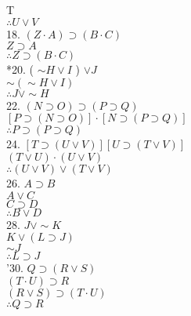 T\\
$\therefore U \vee V$\\
18. $(Z \cdot A) \supset(B \cdot C)$\\
$Z \supset A$\\
$\therefore Z \supset(B \cdot C)$\\
*20. ( $\sim H \vee I$ ) $\vee J$\\
$\sim(\sim H \vee I)$\\
$\therefore J \vee \sim H$\\
22. $(N \supset O) \supset(P \supset Q)$\\
$[P \supset(N \supset O)] \cdot[N \supset(P \supset Q)]$\\
$\therefore P \supset(P \supset Q)$\\
24. $[T \supset(U \vee V)][U \supset(T \vee V)]$\\
$(T \vee U) \cdot(U \vee V)$\\
$\therefore(U \vee V) \vee(T \vee V)$\\
26. $A \supset B$\\
$A \vee C$\\
$C \supset D$\\
$\therefore B \vee D$\\
28. $J \vee \sim K$\\
$K \vee(L \supset J)$\\
$\sim J$\\
$\therefore L \supset J$\\
'30. $Q \supset(R \vee S)$\\
$(T \cdot U) \supset R$\\
$(R \vee S) \supset(T \cdot U)$\\
$\therefore Q \supset R$

